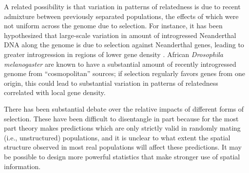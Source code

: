 \documentclass[11pt, oneside]{article}   	%
\begin{document}
A related possibility is that variation in patterns of relatedness is due to recent admixture between previously separated populations,
the effects of which were not uniform across the genome due to selection.
For instance, it has been hypothesized that large-scale variation in amount of introgressed Neanderthal DNA along the genome
is due to selection against Neanderthal genes, leading to greater introgression in regions of lower gene density
\citep{harris2016genetic,juric2016strength}.
African \textit{Drosophila melanogaster} are known to have a substantial amount of recently introgressed genome from ``cosmopolitan'' sources;
if selection regularly favors genes from one origin,
this could lead to substantial variation in patterns of relatedness correlated with local gene density.

There has been substantial debate over the relative impacts of different forms of selection.
These have been difficult to disentangle in part because for the most part
theory makes predictions which are only strictly valid in randomly mating (i.e., unstructured) populations,
and it is unclear to what extent the spatial structure observed in most real populations will affect these predictions.
It may be possible to design more powerful statistics that make stronger use of spatial information.
\end{document}
